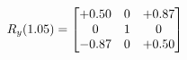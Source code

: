 \documentclass[preview]{standalone}
\begin{document}
\begin{align*}
\special{dvisvgm:raw <g id='unique000'>}R_{y}(1.05) = \begin{bmatrix}+0.50 & 0 & +0.87 \\0 & 1 & 0 \\-0.87 & 0 & +0.50\end{bmatrix}\special{dvisvgm:raw </g>}
\end{align*}
\end{document}
